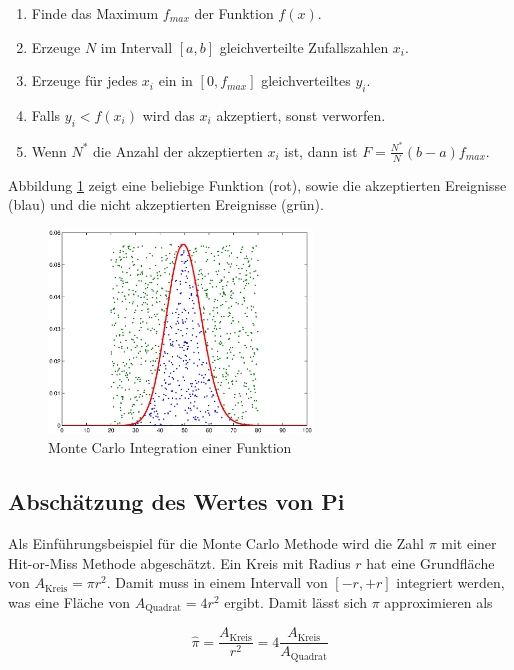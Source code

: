 \documentclass{book}
\begin{document}
\begin{refsection}
\begin{enumerate}
	\item Finde das Maximum $f_{max}$ der Funktion $f(x)$.
	\item Erzeuge $N$ im Intervall $[a,b]$ gleichverteilte Zufallszahlen $x_i$.
	\item Erzeuge für jedes $x_i$ ein in $[0,f_{max}]$ gleichverteiltes $y_i$.
	\item Falls $y_i < f(x_i)$ wird das $x_i$ akzeptiert, sonst verworfen.
	\item Wenn $N^*$ die Anzahl der akzeptierten $x_i$ ist, dann ist $F = \frac{N^*}{N}(b-a)f_{max}$.
\end{enumerate}

Abbildung \ref{fig:integration_histogram} zeigt eine beliebige Funktion (rot), sowie die akzeptierten Ereignisse (blau) und die nicht akzeptierten Ereignisse (grün). \\

\begin{figure}[htbp]
	\centering
	\includegraphics[width=7cm]{images/integration_poisson.eps}
	\caption{Monte Carlo Integration einer Funktion}
	\label{fig:integration_histogram}
\end{figure}

\subsection{Abschätzung des Wertes von Pi}
Als Einführungsbeispiel für die Monte Carlo Methode wird die Zahl $\pi$ mit einer Hit-or-Miss Methode abgeschätzt. Ein Kreis mit Radius $r$ hat eine Grundfläche von $A_{\text{Kreis}} = \pi r^{2}$.  Damit muss in einem Intervall von $[-r,+r]$ integriert werden, was eine Fläche von $A_{\text{Quadrat}} = 4r^2$ ergibt. Damit lässt sich $\pi$ approximieren als

\begin{equation}
	\hat{\pi} = \frac{A_{\text{Kreis}}}{r^2} = 4 \frac{A_{\text{Kreis}}}{A_{\text{Quadrat}}}
\end{equation}


\end{refsection}
\end{document}
